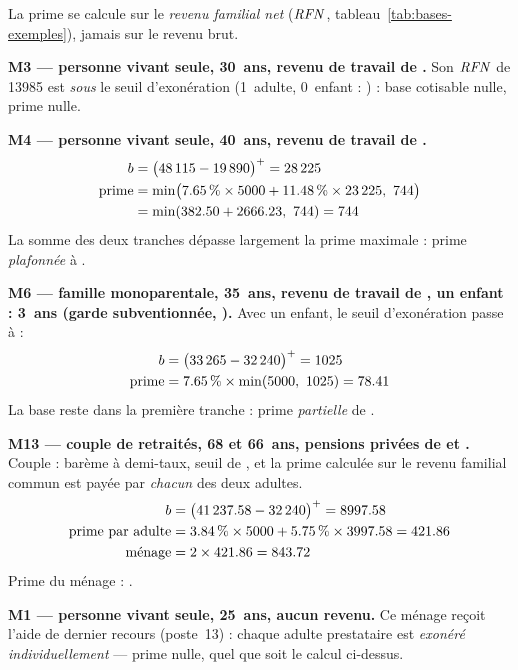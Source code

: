 \pexemples La prime se calcule sur le \emph{revenu familial net} ($\mathit{RFN}$,
tableau~\ref{tab:bases-exemples}), jamais sur le revenu brut.

\medskip\noindent\textbf{M3 --- personne vivant seule, 30~ans, revenu de travail de .}
Son $\mathit{RFN}$ de \num{13985} est \emph{sous} le seuil d'exonération
(1~adulte, 0~enfant : ) : base cotisable nulle, prime nulle.

\medskip\noindent\textbf{M4 --- personne vivant seule, 40~ans, revenu de travail de .}
\begin{align*}
b &= \bigl(\num{48115} - \num{19890}\bigr)^{+} = \num{28225} \\
\text{prime} &= \min\bigl(\num{7.65}\,\% \times \num{5000} + \num{11.48}\,\% \times \num{23225},\ \num{744}\bigr) \\
&= \min(\num{382.50} + \num{2666.23},\ \num{744}) = \num{744}
\end{align*}
La somme des deux tranches dépasse largement la prime maximale : prime
\emph{plafonnée} à .

\medskip\noindent\textbf{M6 --- famille monoparentale, 35~ans, revenu de travail de , un enfant : 3~ans (garde subventionnée, ).}
Avec un enfant, le seuil d'exonération passe à  :
\begin{align*}
b &= \bigl(\num{33265} - \num{32240}\bigr)^{+} = \num{1025} \\
\text{prime} &= \num{7.65}\,\% \times \min(\num{5000},\ \num{1025}) = \num{78.41}
\end{align*}
La base reste dans la première tranche : prime \emph{partielle} de
.

\medskip\noindent\textbf{M13 --- couple de retraités, 68 et 66~ans, pensions privées de  et .}
Couple : barème à demi-taux, seuil de , et la prime
calculée sur le revenu familial commun est payée par \emph{chacun} des deux
adultes.
\begin{align*}
b &= \bigl(\num{41237.58} - \num{32240}\bigr)^{+} = \num{8997.58} \\
\text{prime par adulte} &= \num{3.84}\,\% \times \num{5000} + \num{5.75}\,\% \times \num{3997.58} = \num{421.86} \\
\text{ménage} &= 2 \times \num{421.86} = \num{843.72}
\end{align*}
Prime du ménage : .

\medskip\noindent\textbf{M1 --- personne vivant seule, 25~ans, aucun revenu.}
Ce ménage reçoit l'aide de dernier recours (poste~13) : chaque adulte
prestataire est \emph{exonéré individuellement} — prime nulle, quel que soit
le calcul ci-dessus.
